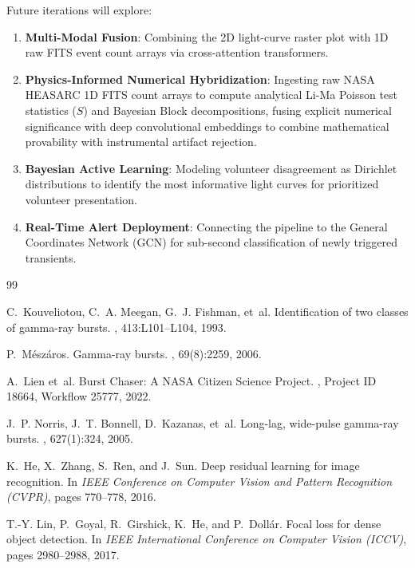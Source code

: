 \documentclass[10pt,twocolumn]{article}
\begin{document}
Future iterations will explore:
\begin{enumerate}
    \item \textbf{Multi-Modal Fusion}: Combining the 2D light-curve raster plot with 1D raw FITS event count arrays via cross-attention transformers.
    \item \textbf{Physics-Informed Numerical Hybridization}: Ingesting raw NASA HEASARC 1D FITS count arrays to compute analytical Li-Ma Poisson test statistics ($S$) and Bayesian Block decompositions, fusing explicit numerical significance with deep convolutional embeddings to combine mathematical provability with instrumental artifact rejection.
    \item \textbf{Bayesian Active Learning}: Modeling volunteer disagreement as Dirichlet distributions to identify the most informative light curves for prioritized volunteer presentation.
    \item \textbf{Real-Time Alert Deployment}: Connecting the pipeline to the General Coordinates Network (GCN) for sub-second classification of newly triggered transients.
\end{enumerate}

\begin{thebibliography}{99}

C.~Kouveliotou, C.~A. Meegan, G.~J. Fishman, et~al.
\newblock Identification of two classes of gamma-ray bursts.
, 413:L101--L104, 1993.

P.~M{\'e}sz{\'a}ros.
\newblock Gamma-ray bursts.
, 69(8):2259, 2006.

A.~Lien et~al.
\newblock Burst Chaser: A NASA Citizen Science Project.
, Project ID 18664, Workflow 25777, 2022.

J.~P. Norris, J.~T. Bonnell, D.~Kazanas, et~al.
\newblock Long-lag, wide-pulse gamma-ray bursts.
, 627(1):324, 2005.

K.~He, X.~Zhang, S.~Ren, and J.~Sun.
\newblock Deep residual learning for image recognition.
\newblock In {\em IEEE Conference on Computer Vision and Pattern Recognition (CVPR)}, pages 770--778, 2016.

T.-Y. Lin, P.~Goyal, R.~Girshick, K.~He, and P.~Doll{\'a}r.
\newblock Focal loss for dense object detection.
\newblock In {\em IEEE International Conference on Computer Vision (ICCV)}, pages 2980--2988, 2017.

\end{thebibliography}
\end{document}
